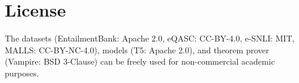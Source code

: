 \section{License}

The datasets (EntailmentBank: Apache 2.0, eQASC: CC-BY-4.0, e-SNLI: MIT, MALLS: CC-BY-NC-4.0), models (T5: Apache 2.0), and theorem prover (Vampire: BSD 3-Clause) can be freely used for non-commercial academic purposes.